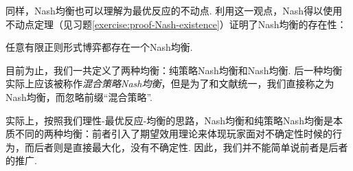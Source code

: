 同样，Nash均衡也可以理解为最优反应的不动点. 利用这一观点，Nash得以使用不动点定理（见习题\ref{exercise:proof-Nash-existence}）证明了Nash均衡的存在性：
\begin{theorem}[Nash均衡存在性定理]\label{thm:Nash-existence}
任意有限正则形式博弈都存在一个Nash均衡.
\end{theorem}

\begin{remark}
    目前为止，我们一共定义了两种均衡：纯策略Nash均衡和Nash均衡. 后一种均衡实际上应该被称作\textit{混合策略Nash均衡}，但是为了和文献统一，我们直接称之为Nash均衡，而忽略前缀“混合策略”.

    实际上，按照我们理性-最优反应-均衡的思路，Nash均衡和纯策略Nash均衡是本质不同的两种均衡：前者引入了期望效用理论来体现玩家面对不确定性时候的行为，而后者则是直接最大化，没有不确定性. 因此，我们并不能简单说前者是后者的推广. 
\end{remark}

